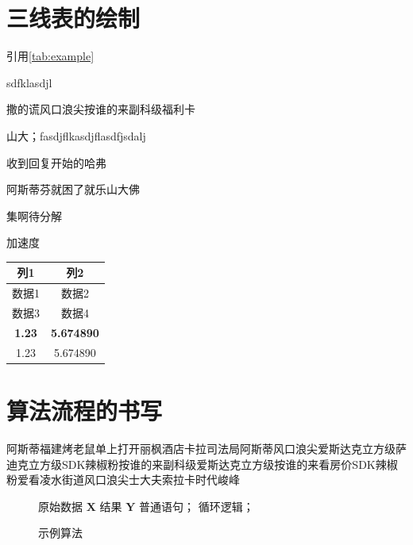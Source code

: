 \section{三线表的绘制}

引用\autoref{tab:example}

sdfklasdjl

撒的谎风口浪尖按谁的来副科级福利卡

山大；fasdjflkasdjflasdfjsdalj

收到回复开始的哈弗

阿斯蒂芬就困了就乐山大佛

集啊待分解

加速度


\begin{table}[h]
    \label{tab:example}
    \centering
    \vspace{-0.2cm}
    \wuhao\yingsong
    \begin{tabular}{cc}
        \hline
        列1 & 列2  \\
        \hline
        数据1 & 数据2 \\
        数据3 & 数据4 \\
        \bfseries{1.23} & \bfseries{5.674890} \\
        1.23 & 5.674890 \\
        \hline
    \end{tabular}
\end{table}

\section{算法流程的书写}

阿斯蒂福建烤老鼠单上打开丽枫酒店卡拉司法局阿斯蒂风口浪尖爱斯达克立方级萨迪克立方级SDK辣椒粉按谁的来副科级爱斯达克立方级按谁的来看房价SDK辣椒粉爱看凌水街道风口浪尖士大夫索拉卡时代峻峰

\begin{figure}
    \centering
    \begin{minipage}{0.75\linewidth}
        \begin{algorithm}[H]
            \caption{示例算法}
            \label{alg-1}
            \begin{algorithmic}[1]
                \Require 原始数据 $\mathbf{X}$
                \Ensure 结果 $\mathbf{Y}$
                \State 普通语句；
                    \State 循环逻辑；
                \EndFor
            \end{algorithmic}
        \end{algorithm}
    \end{minipage}
\end{figure}

